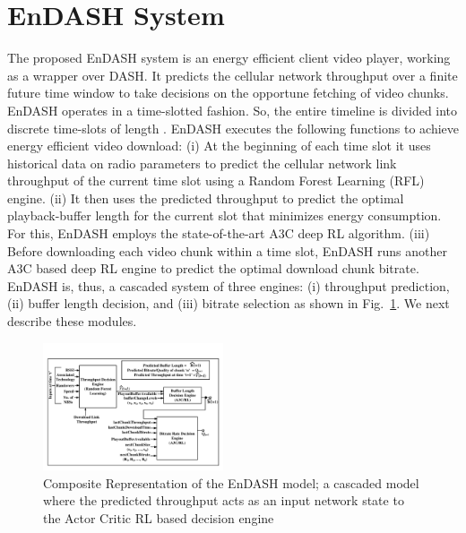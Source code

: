 \section{\textbf{EnDASH System}}\label{sec:chap04:sys_overview}
The proposed EnDASH system is an energy efficient client video player, working as a wrapper over \ac{DASH}. It predicts the cellular network throughput over a finite future time window to take decisions on the opportune fetching of  video chunks.  EnDASH operates in a time-slotted fashion. So, the entire timeline is divided into discrete time-slots of length .
EnDASH executes the following functions to achieve energy efficient video download: (i) At the beginning of each time slot it uses historical data on radio parameters to predict the cellular network link throughput of the current time slot using a Random Forest Learning (RFL) engine. (ii) It then uses the predicted throughput to predict the optimal playback-buffer length for the current slot that minimizes energy consumption. For this, EnDASH employs the state-of-the-art \ac{A3C} deep \ac{RL} algorithm.  (iii) Before downloading each video chunk within a time slot, EnDASH runs another A3C based deep \ac{RL} engine to predict the optimal download chunk  bitrate. 
EnDASH is, thus, a cascaded system of three engines: (i) throughput prediction, (ii) buffer length decision,  and (iii) bitrate selection as shown in Fig.~\ref{fig:chap04:EnDASH system}. We next describe these modules.
 \begin{figure}[t]
	\centering
	\includegraphics[width = 0.475\textwidth,trim = {1cm 1cm 1cm 1cm}]{figures/EnDASH_system.pdf}
	\caption{Composite Representation of the EnDASH model; a cascaded model where the predicted throughput acts as an input network state to the Actor Critic \ac{RL} based decision engine}
	\label{fig:chap04:EnDASH system}
\end{figure}
